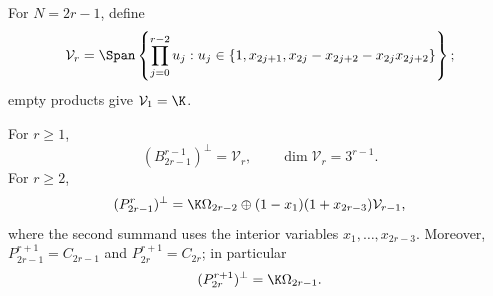 For $N=2r-1$, define
\begin{equation}\label{eq:dual-path-V}
\mathcal V_r=\Span\left\{
 \prod_{j=0}^{r-2}u_j:
 u_j\in\{1,x_{2j+1},x_{2j}-x_{2j+2}-x_{2j}x_{2j+2}\}
\right\};
\end{equation}
empty products give $\mathcal V_1=\K$.

\begin{lemma}\label{lem:dual-path}
For $r\ge1$,
\begin{equation}\label{eq:dual-closed-path}
(B_{2r-1}^{r-1})^\perp=\mathcal V_r,
\qquad \dim\mathcal V_r=3^{r-1}.
\end{equation}
For $r\ge2$,
\begin{equation}\label{eq:dual-odd-open-path}
(P_{2r-1}^{r})^\perp
 =\K\Omega_{2r-2}\oplus
 (1-x_1)(1+x_{2r-3})\mathcal V_{r-1},
\end{equation}
where the second summand uses the interior variables
$x_1,\ldots,x_{2r-3}$. Moreover, $P_{2r-1}^{r+1}=C_{2r-1}$
and $P_{2r}^{r+1}=C_{2r}$; in particular
\begin{equation}\label{eq:dual-even-open-path}
(P_{2r}^{r+1})^\perp=\K\Omega_{2r-1}.
\end{equation}
\end{lemma}

